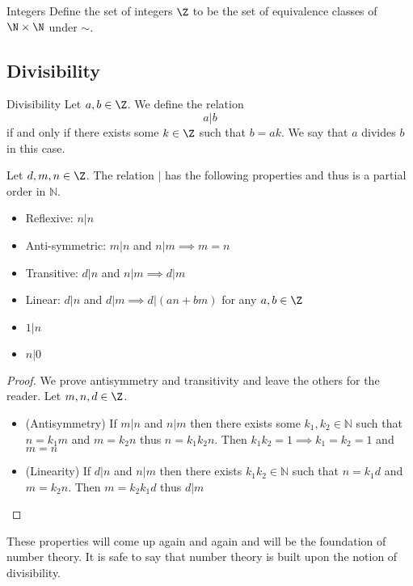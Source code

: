 \documentclass[a4paper]{article}
\begin{document}
\begin{defn}{Integers}{} Define the set of integers $\Z$ to be the set of equivalence classes of $\N\times\N$ under $\sim$. 
\end{defn}



\subsection{Divisibility}
\begin{defn}{Divisibility}{} Let $a,b\in\Z$. We define the relation $$a|b$$ if and only if there exists some $k\in\Z$ such that $b=ak$. We say that $a$ divides $b$ in this case. 
\end{defn}

\begin{prp}{}{} Let $d,m,n\in\Z$. The relation $|$ has the following properties and thus is a partial order in $\mathbb{N}$. 
\begin{itemize}
\item Reflexive: $n|n$
\item Anti-symmetric: $m|n$ and $n|m\implies m=n$
\item Transitive: $d|n$ and $n|m\implies d|m$
\item Linear: $d|n$ and $d|m\implies d|(an+bm)$ for any $a,b\in\Z$
\item $1|n$
\item $n|0$
\end{itemize} \tcbline
\begin{proof} We prove antisymmetry and transitivity and leave the others for the reader. Let $m,n,d\in\Z$. 
\begin{itemize}
\item (Antisymmetry) If $m|n$ and $n|m$ then there exists some $k_1,k_2\in\mathbb{N}$ such that $n=k_1m$ and $m=k_2n$ thus $n=k_1k_2n$. Then $k_1k_2=1\implies k_1=k_2=1$ and $m=n$
\item (Linearity) If $d|n$ and $n|m$ then there exists $k_1k_2\in\mathbb{N}$ such that $n=k_1d$ and $m=k_2n$. Then $m=k_2k_1d$ thus $d|m$
\end{itemize}
\end{proof}
\end{prp}

These properties will come up again and again and will be the foundation of number theory. It is safe to say that number theory is built upon the notion of divisibility. 
\end{document}
